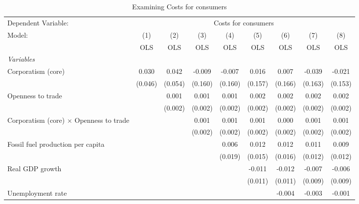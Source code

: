 
\begin{table}[htbp]
   \caption{Examining Costs for consumers}
   \centering
   \begin{tabular}{lcccccccc}
      \toprule
      Dependent Variable: & \multicolumn{8}{c}{Costs for consumers}\\
      Model:                                         & (1)     & (2)     & (3)     & (4)     & (5)     & (6)     & (7)     & (8)\\  
                                                     &  OLS    & OLS     & OLS     & OLS     & OLS     & OLS     & OLS     & OLS\\  
      \midrule
      \emph{Variables}\\
      Corporatism (core)                             & 0.030   & 0.042   & -0.009  & -0.007  & 0.016   & 0.007   & -0.039  & -0.021\\   
                                                     & (0.046) & (0.054) & (0.160) & (0.160) & (0.157) & (0.166) & (0.163) & (0.153)\\   
      Openness to trade                              &         & 0.001   & 0.001   & 0.001   & 0.002   & 0.002   & 0.002   & 0.002\\   
                                                     &         & (0.002) & (0.002) & (0.002) & (0.002) & (0.002) & (0.002) & (0.002)\\   
      Corporatism (core) $\times$ Openness to trade  &         &         & 0.001   & 0.001   & 0.001   & 0.000   & 0.001   & 0.001\\   
                                                     &         &         & (0.002) & (0.002) & (0.002) & (0.002) & (0.002) & (0.002)\\   
      Fossil fuel production per capita              &         &         &         & 0.006   & 0.012   & 0.012   & 0.011   & 0.009\\   
                                                     &         &         &         & (0.019) & (0.015) & (0.016) & (0.012) & (0.012)\\   
      Real GDP growth                                &         &         &         &         & -0.011  & -0.012  & -0.007  & -0.006\\   
                                                     &         &         &         &         & (0.011) & (0.011) & (0.009) & (0.009)\\   
      Unemployment rate                              &         &         &         &         &         & -0.004  & -0.003  & -0.001\\   

\end{tabular}
\end{table}
